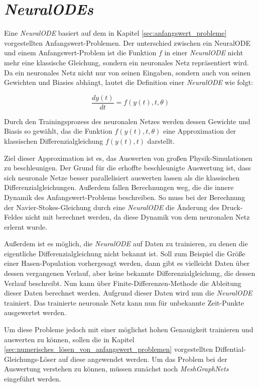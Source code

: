 
\section{\textit{NeuralODEs}} \label{sec:neural_ode}

Eine \textit{NeuralODE} \cite{neuralode} basiert auf dem in Kapitel \ref{sec:anfangswert_probleme} vorgestellten Anfangswert-Problemen.
Der unterschied zwischen ein NeuralODE und einem Anfangswert-Problem ist 
die Funktion $f$ in einer \textit{NeuralODE} nicht mehr eine klassische Gleichung, 
sondern ein neuronales Netz repräsentiert wird.
Da ein neuronales Netz nicht nur von seinen Eingaben, 
sondern auch von seinen Gewichten und Biasies abhängt,
lautet die Definition einer \textit{NeuralODE} wie folgt:

$$
\frac{d y(t)}{dt} = f(y(t), t, \theta)
$$

Durch den Trainingsprozess des neuronalen Netzes werden dessen Gewichte und Biasis 
so gewählt, das die Funktion $f(y(t), t, \theta)$ eine Approximation der klassischen 
Differenzialgleichung $f(y(t), t)$ darstellt.

Ziel dieser Approximation ist es, das Auswerten von großen Physik-Simulationen zu beschleunigen.
Der Grund für die erhoffte beschleunigte Auswertung ist, dass sich neuronale Netze besser parallelisiert auswerten lassen
als die klassischen Differenzialgleichungen.
Außerdem fallen Berechnungen weg, die die innere Dynamik des Anfangswert-Problems beschreiben.
So muss bei der Berechnung der Navier-Stokes-Gleichung durch eine \textit{NeuralODE} die Änderung des Druck-Feldes 
nicht mit berechnet werden, da diese Dynamik von dem neuronalen Netz erlernt wurde.

Außerdem ist es möglich, die \textit{NeuralODE} auf Daten zu trainieren, 
zu denen die eigentliche Differenzialgleichung nicht bekannt ist.
Soll zum Beispiel die Größe einer Hasen-Population vorhergesagt werden, dann gibt es vielleicht Daten über dessen 
vergangenen Verlauf, aber keine bekannte Differenzialgleichung, die dessen Verlauf beschreibt.
Nun kann über Finite-Differenzen-Methode die Ableitung dieser Daten berechnet werden.
Aufgrund dieser Daten wird nun die \textit{NeuralODE} trainiert.
Das trainierte neuronale Netz kann nun für unbekannte Zeit-Punkte ausgewertet werden.

Um diese Probleme jedoch mit einer möglichst hohen Genauigkeit trainieren und auswerten zu können,
sollen die in Kapitel \ref{sec:numerisches_lösen_von_anfangswert_problemen} vorgestellten Diffential-Gleichungs-Löser auf diese angewendet werden.
Um das Problem bei der Auswertung verstehen zu können, müssen zunächst noch \textit{MeshGraphNets} eingeführt werden.






